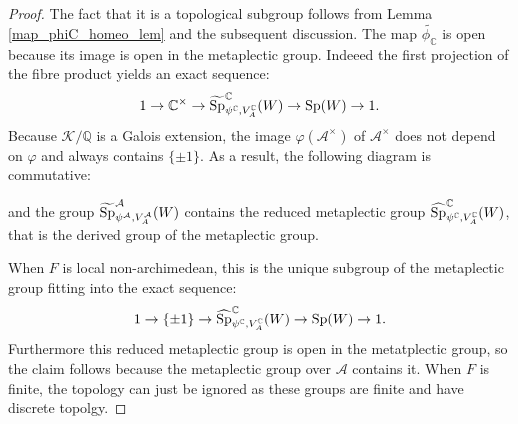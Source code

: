 \documentclass[11pt]{article}
\theoremstyle{plain}
\theoremstyle{definition}
\theoremstyle{plain}
\theoremstyle{definition}
\theoremstyle{plain}
\begin{document}
\begin{proof} The fact that it is a topological subgroup follows from Lemma \ref{map_phiC_homeo_lem} and the subsequent discussion. The map $\widetilde{\phi_\mathbb{C}}$ is open because its image is open in the metaplectic group. Indeeed the first projection of the fibre product yields an exact sequence:
$$1 \to \mathbb{C}^\times \to \widetilde{\textup{Sp}}_{\psi^\mathbb{C},V_A^\mathbb{C}}^\mathbb{C}(W) \to \textup{Sp}(W) \to 1.$$
Because $\mathcal{K}/\mathbb{Q}$ is a Galois extension, the image $\varphi(\mathcal{A}^\times)$ of $\mathcal{A}^\times$ does not depend on $\varphi$ and always contains $\{ \pm 1 \}$. As a result, the following diagram is commutative:
\begin{center}  \end{center}
and the group $\widetilde{\textup{Sp}}_{\psi^\mathcal{A},V_A^\mathcal{A}}^\mathcal{A}(W)$ contains the reduced metaplectic group $\widehat{\textup{Sp}}_{\psi^\mathbb{C},V_A^\mathbb{C}}^\mathbb{C}(W)$, that is the derived group of the metaplectic group.

When $F$ is local non-archimedean, this is the unique subgroup of the metaplectic group fitting into the exact sequence:
$$1 \to \{ \pm 1 \} \to \widehat{\textup{Sp}}_{\psi^\mathbb{C},V_A^\mathbb{C}}^\mathbb{C}(W) \to \textup{Sp}(W) \to 1.$$
Furthermore this reduced metaplectic group is open in the metatplectic group, so the claim follows because the metaplectic group over $\mathcal{A}$ contains it. When $F$ is finite, the topology can just be ignored as these groups are finite and have discrete topolgy. \end{proof}
\end{document}
